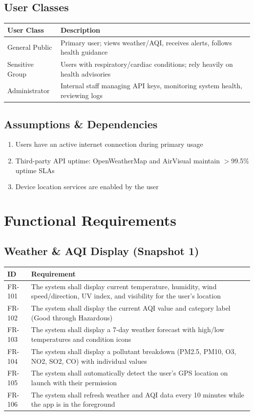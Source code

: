 \documentclass[12pt]{article}
\begin{document}
\subsection{User Classes}
\begin{tabularx}{\textwidth}{@{}L{3.5cm}Y@{}}
\toprule
\textbf{User Class} & \textbf{Description} \\
\midrule
General Public & Primary user; views weather/AQI, receives alerts, follows health guidance \\
Sensitive Group & Users with respiratory/cardiac conditions; rely heavily on health advisories \\
Administrator & Internal staff managing API keys, monitoring system health, reviewing logs \\
\bottomrule
\end{tabularx}

\subsection{Assumptions \& Dependencies}
\begin{enumerate}
    \item Users have an active internet connection during primary usage
    \item Third-party API uptime: OpenWeatherMap and AirVisual maintain $>$99.5\% uptime SLAs
    \item Device location services are enabled by the user
\end{enumerate}

\section{Functional Requirements}

\subsection{Weather \& AQI Display (Snapshot 1)}
\begin{tabularx}{\textwidth}{@{}L{2.2cm}Y@{}}
\toprule
\textbf{ID} & \textbf{Requirement} \\
\midrule
FR-101 & The system shall display current temperature, humidity, wind speed/direction, UV index, and visibility for the user's location \\
FR-102 & The system shall display the current AQI value and category label (Good through Hazardous) \\
FR-103 & The system shall display a 7-day weather forecast with high/low temperatures and condition icons \\
FR-104 & The system shall display a pollutant breakdown (PM2.5, PM10, O3, NO2, SO2, CO) with individual values \\
FR-105 & The system shall automatically detect the user's GPS location on launch with their permission \\
FR-106 & The system shall refresh weather and AQI data every 10 minutes while the app is in the foreground \\
\bottomrule
\end{tabularx}
\end{document}
